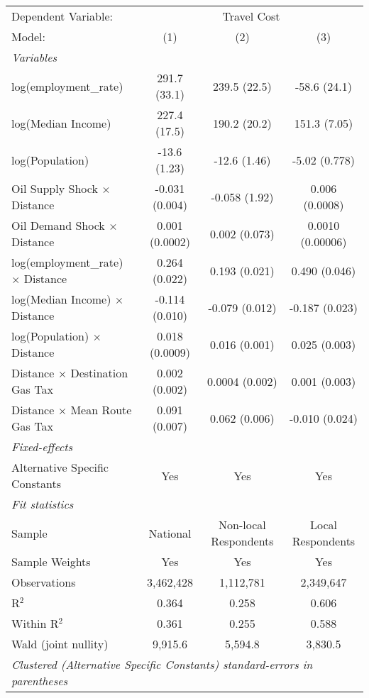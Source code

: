 
\begingroup
\centering
\begin{tabular}{lccc}
   \tabularnewline \midrule \midrule
   Dependent Variable: & \multicolumn{3}{c}{Travel Cost}\\
   Model:                                    & (1)            & (2)                   & (3)\\  
   \midrule
   \emph{Variables}\\
   log(employment\_rate)                     & 291.7 (33.1)   & 239.5 (22.5)          & -58.6 (24.1)\\   
   log(Median Income)                        & 227.4 (17.5)   & 190.2 (20.2)          & 151.3 (7.05)\\   
   log(Population)                           & -13.6 (1.23)   & -12.6 (1.46)          & -5.02 (0.778)\\   
   Oil Supply Shock $\times$ Distance        & -0.031 (0.004) & -0.058 (1.92)         & 0.006 (0.0008)\\   
   Oil Demand Shock $\times$ Distance        & 0.001 (0.0002) & 0.002 (0.073)         & 0.0010 (0.00006)\\   
   log(employment\_rate) $\times$ Distance   & 0.264 (0.022)  & 0.193 (0.021)         & 0.490 (0.046)\\   
   log(Median Income) $\times$ Distance      & -0.114 (0.010) & -0.079 (0.012)        & -0.187 (0.023)\\   
   log(Population) $\times$ Distance         & 0.018 (0.0009) & 0.016 (0.001)         & 0.025 (0.003)\\   
   Distance $\times$ Destination Gas Tax     & 0.002 (0.002)  & 0.0004 (0.002)        & 0.001 (0.003)\\   
   Distance $\times$ Mean Route Gas Tax      & 0.091 (0.007)  & 0.062 (0.006)         & -0.010 (0.024)\\   
   \midrule
   \emph{Fixed-effects}\\
   Alternative Specific Constants            & Yes            & Yes                   & Yes\\  
   \midrule
   \emph{Fit statistics}\\
   Sample                                    & National       & Non-local Respondents & Local Respondents\\  
   Sample Weights                            & Yes            & Yes                   & Yes\\  
   Observations                              & 3,462,428      & 1,112,781             & 2,349,647\\  
   R$^2$                                     & 0.364          & 0.258                 & 0.606\\  
   Within R$^2$                              & 0.361          & 0.255                 & 0.588\\  
   Wald (joint nullity)                      & 9,915.6        & 5,594.8               & 3,830.5\\  
   \midrule \midrule
   \multicolumn{4}{l}{\emph{Clustered (Alternative Specific Constants) standard-errors in parentheses}}\\
\end{tabular}
\par\endgroup


